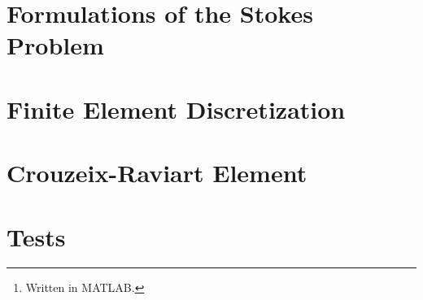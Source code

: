 \documentclass[12pt]{article}
\title{\reporttitle}
\author{Andrea Di Antonio, 858798 \\ \hyperlink{mailto:a.diantonio1@campus.unimib.it}{a.diantonio1@campus.unimib.it}}
\date{Exam session of February 29, 2024 \\ Academic Year 2023-24}
\begin{document}
	\maketitle
	\thispagestyle{fancy}

	\begin{abstract}
		\begin{center}
			Report for the course \textit{Metodi Numerici Avanzati per Equazioni alle Derivate Parziali} focusing on the definition, implementation\footnote{Written in MATLAB.}, and convergence analysis of the Crouzeix-Raviart element for the Stokes Problem.
		\end{center}
	\end{abstract}

	\newpage
	\tableofcontents

	\newpage
	\section{Formulations of the Stokes Problem}
	

	\newpage
	\section{Finite Element Discretization}
	

	\newpage
	\section{Crouzeix-Raviart Element}
	

	\newpage
	\section{Tests}
	
\end{document}
